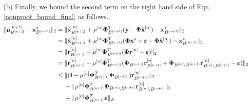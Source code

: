 \documentclass{article}
\begin{document}
(b) Finally, we bound the second term on the right hand side of Eqn. \ref{nonproof_bound_final} as follows.
\begin{equation}\label{last_term_main_theorem}
    \begin{split}
       \|{{\bf a}}_{B^{[n+1]}}^{[n+1]} - {{\bf x}}_{B^{[n+1]}}^{*} \|_2 &= \|{\hat{\bf x}}_{B^{[n+1]}}^{[n]} + \mu^{[n]}{\bf \Phi}_{B^{[n+1]}}^T({\bf y}-{\bf \Phi} \hat{{\bf x}}^{[n]}) - {{\bf x}}_{B^{[n+1]}}^{*} \|_2\\
        &= \|{\hat{\bf x}}_{B^{[n+1]}}^{[n]} + \mu^{[n]}{\bf \Phi}_{B^{[n+1]}}^T({\bf \Phi} {\bf x}^s + \boldsymbol{\varepsilon}-{\bf \Phi} \hat{\bf x}^{[n]}) - {{\bf x}}_{B^{[n+1]}}^{*} \|_2\\
         &= \|{{\bf r}}_{B^{[n+1]}}^{[n]} - \mu^{[n]}{\bf \Phi}_{B^{[n+1]}}^T({\bf \Phi} {\bf r}^{[n]}  -\boldsymbol{\varepsilon}) \|_2\\
         &= \|{{\bf r}}_{B^{[n+1]}}^{[n]} - \mu^{[n]}{\bf \Phi}_{B^{[n+1]}}^T({\bf \Phi}_{B^{[n+1]}}{\bf r}^{[n]}_{B^{[n+1]}} + {\bf \Phi}_{B^{[n]}\backslash B^{[n+1]}}{\bf r}^{[n]}_{B^{[n]}\backslash B^{[n+1]}}  - \boldsymbol{\varepsilon}) \|_2\\
         &\leq \|({\boldsymbol{\rm I}} - \mu^{[n]}{\bf \Phi}_{B^{[n+1]}}^T{\bf \Phi}_{B^{[n+1]}}){\bf r}^{[n]}_{B^{[n+1]}}\|_2\\
         &\ \ \ \ + \|\mu^{[n]}{\bf \Phi}_{B^{[n+1]}}^T{\bf \Phi}_{B^{[n]}\backslash B^{[n+1]}}{\bf r}^{[n]}_{B^{[n]}\backslash B^{[n+1]}}\|_2\\
         &\ \ \ \ + \|\mu^{[n]}{\bf \Phi}_{B^{[n+1]}}^T\boldsymbol{\varepsilon}\|_2.
    \end{split}
\end{equation}
\end{document}
